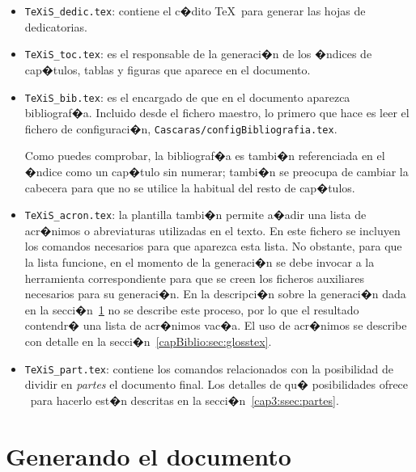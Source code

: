 \begin{itemize}
  \item \texttt{TeXiS\_dedic.tex}: contiene el c�dito \TeX\ para
    generar las hojas de dedicatorias.

  \item \texttt{TeXiS\_toc.tex}: es el responsable de la generaci�n de
    los �ndices de cap�tulos, tablas y figuras que aparece en el
    documento.

  \item \texttt{TeXiS\_bib.tex}: es el encargado de que en el
    documento aparezca bibliograf�a. Incluido desde el fichero
    maestro, lo primero que hace es leer el fichero de configuraci�n,
    \texttt{Cascaras/configBibliografia.tex}.

    Como puedes comprobar, la bibliograf�a es tambi�n referenciada en
    el �ndice como un cap�tulo sin numerar; tambi�n se preocupa de
    cambiar la cabecera para que no se utilice la habitual del resto
    de cap�tulos.

\item \texttt{TeXiS\_acron.tex}: la plantilla tambi�n permite a�adir
  una lista de acr�nimos o abreviaturas utilizadas en el texto. En
  este fichero se incluyen los comandos necesarios para que aparezca
  esta lista. No obstante, para que la lista funcione, en el momento
  de la generaci�n se debe invocar a la herramienta correspondiente
  para que se creen los ficheros auxiliares necesarios para su
  generaci�n. En la descripci�n sobre la generaci�n dada en la
  secci�n~\ref{cap2:sec:compilacion} no se describe este proceso,
  por lo que el resultado contendr� una lista de acr�nimos
  vac�a. El uso de acr�nimos se describe con detalle en la
  secci�n~\ref{capBiblio:sec:glosstex}.

\item \texttt{TeXiS\_part.tex}: contiene los comandos relacionados con
  la posibilidad de dividir en \emph{partes} el documento final. Los
  detalles de qu� posibilidades ofrece \texis\ para hacerlo est�n
  descritas en la secci�n~\ref{cap3:ssec:partes}.

\end{itemize}
  
\section{Generando el documento}
\label{cap2:sec:compilacion}

